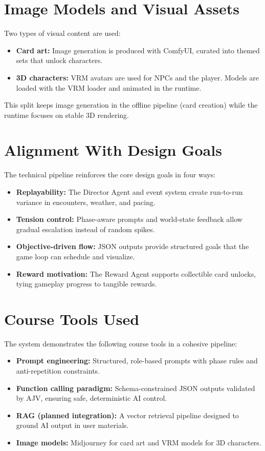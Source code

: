 \documentclass[12pt]{article}
\begin{document}
\section*{Image Models and Visual Assets}
Two types of visual content are used:
\begin{itemize}[leftmargin=1.1em]
  \item \textbf{Card art:} Image generation is produced with ComfyUI, curated into themed sets that unlock characters.
  \item \textbf{3D characters:} VRM avatars are used for NPCs and the player. Models are loaded with the VRM loader and animated in the runtime.
\end{itemize}

This split keeps image generation in the offline pipeline (card creation) while the runtime focuses on stable 3D rendering.

\section*{Alignment With Design Goals}
The technical pipeline reinforces the core design goals in four ways:
\begin{itemize}[leftmargin=1.1em]
  \item \textbf{Replayability:} The Director Agent and event system create run-to-run variance in encounters, weather, and pacing.
  \item \textbf{Tension control:} Phase-aware prompts and world-state feedback allow gradual escalation instead of random spikes.
  \item \textbf{Objective-driven flow:} JSON outputs provide structured goals that the game loop can schedule and visualize.
  \item \textbf{Reward motivation:} The Reward Agent supports collectible card unlocks, tying gameplay progress to tangible rewards.
\end{itemize}

\section*{Course Tools Used}
The system demonstrates the following course tools in a cohesive pipeline:
\begin{itemize}[leftmargin=1.1em]
  \item \textbf{Prompt engineering:} Structured, role-based prompts with phase rules and anti-repetition constraints.
  \item \textbf{Function calling paradigm:} Schema-constrained JSON outputs validated by AJV, ensuring safe, deterministic AI control.
  \item \textbf{RAG (planned integration):} A vector retrieval pipeline designed to ground AI output in user materials.
  \item \textbf{Image models:} Midjourney for card art and VRM models for 3D characters.
\end{itemize}
\end{document}

